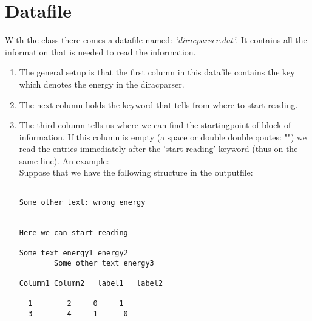 \documentclass[a4paper, fleqn]{article}
\begin{document}
\section{Datafile}
With the class there comes a datafile named: \textit{'diracparser.dat'}. It contains all the information that is needed to read the information.  \\
\begin{enumerate}
\item The general setup is that the first column in this datafile contains the key which denotes the energy in the diracparser. 
\item The next column holds the keyword that tells from where to start reading. 
\item The third column tells us where we can find the startingpoint of  block of information. If this column is empty (a space or double double qoutes: "") we read the entries immediately after the 'start reading' keyword (thus on the same line). 
An example: \\
Suppose that we have the following structure in the outputfile:
\begin{verbatim}

Some other text: wrong energy


Here we can start reading

Some text energy1 energy2
        Some other text energy3

Column1 Column2   label1   label2

  1        2     0     1
  3        4     1      0



\end{verbatim}
\end{enumerate}
\end{document}
